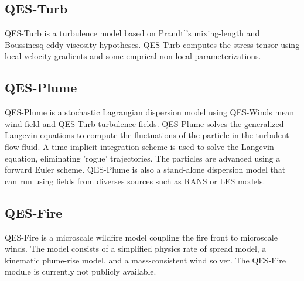 \subsection{QES-Turb}

QES-Turb is a turbulence model based on Prandtl’s mixing-length and Boussinesq eddy-viscosity hypotheses. QES-Turb computes the stress tensor using local velocity gradients and some emprical non-local parameterizations.

\subsection{QES-Plume}

QES-Plume is a stochastic Lagrangian dispersion model using QES-Winds mean wind field and QES-Turb turbulence fields. QES-Plume solves the generalized Langevin equations to compute the fluctuations of the particle in the turbulent flow fluid. A time-implicit integration scheme is used to solve the Langevin equation, eliminating 'rogue' trajectories. The particles are advanced using a forward Euler scheme. QES-Plume is also a stand-alone dispersion model that can run using fields from diverses sources such as RANS or LES models. 


\subsection{QES-Fire}

QES-Fire is a microscale wildfire model coupling the fire front to microscale winds. The model consists of a simplified physics rate of spread model, a kinematic plume-rise model, and a mass-consistent wind solver. The QES-Fire module is currently not publicly available. 
